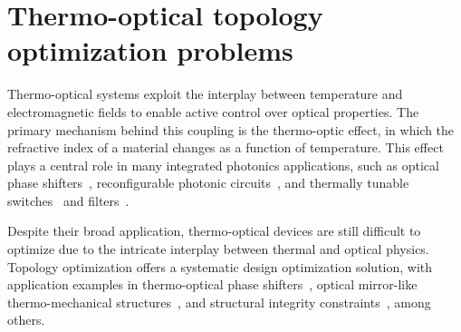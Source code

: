 \chapter{Thermo-optical topology optimization problems}\label{chap:to}
Thermo-optical systems exploit the interplay between temperature and electromagnetic fields to enable active control over optical properties. 
The primary mechanism behind this coupling is the thermo-optic effect, 
in which the refractive index of a material changes as a function of temperature. 
This effect plays a central role in many integrated photonics applications, such as
 optical phase shifters~\cite{TOPS_1, TOPS_2, TOPS_3}, reconfigurable photonic circuits~\cite{program, PIC}, and thermally tunable switches~\cite{switch, switch_2} and filters~\cite{filter}.

 Despite their broad application, thermo-optical devices are still difficult to optimize due to the intricate interplay between thermal and optical physics.
  Topology optimization offers a systematic design optimization solution, with application examples in
 thermo-optical phase shifters~\cite{TOPS_heat, ownpub0}, optical mirror-like thermo-mechanical structures~\cite{opt_perf}, and
structural integrity constraints~\cite{structural_heat}, among others.


